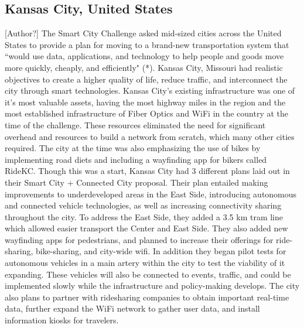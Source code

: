 \documentclass[12pt]{article}                         %
\begin{document}
\subsection{Kansas City, United States}[Author?]
The Smart City Challenge asked mid-sized cities across the United States to provide a plan for moving to a brand-new transportation system that “would use data, applications, and technology to help people and goods move more quickly, cheaply, and efficiently" (*). Kansas City, Missouri had realistic objectives to create a higher quality of life, reduce traffic, and interconnect the city through smart technologies. Kansas City’s existing infrastructure was one of it’s most valuable assets, having the most highway miles in the region and the most established infrastructure of Fiber Optics and WiFi in the country at the time of the challenge. These resources eliminated the need for significant overhead and resources to build a network from scratch, which many other cities required. The city at the time was also emphasizing the use of bikes by implementing road diets and including a wayfinding app for bikers called RideKC. Though this was a start, Kansas City had 3 different plans laid out in their Smart City + Connected City proposal. Their plan entailed making improvements to underdeveloped areas in the East Side, introducing autonomous and connected vehicle technologies, as well as increasing connectivity sharing throughout the city. To address the East Side, they added a 3.5 km tram line which allowed easier transport the Center and East Side. They also added new wayfinding apps for pedestrians, and planned to increase their offerings for ride-sharing, bike-sharing, and city-wide wifi. In addition they began pilot tests for autonomous vehicles in a main artery within the city to test the viability of it expanding. These vehicles will also be connected to events, traffic, and could be implemented slowly while the infrastructure and policy-making develops. The city also plans to partner with ridesharing companies to obtain important real-time data, further expand the WiFi network to gather user data, and install information kiosks for travelers.
\end{document}
